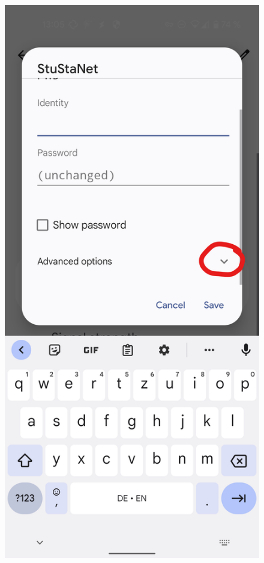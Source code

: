 \documentclass[a4paper,12pt]{scrartcl}
\begin{document}
\begin{figure}[h]
\begin{minipage}{0.24\textwidth}
		\includegraphics[width=0.7\linewidth,keepaspectratio]{Bilder/Android/android12_3}
	\end{minipage}
	\begin{minipage}{0.24\textwidth}

\end{minipage}
\end{figure}
\end{document}
